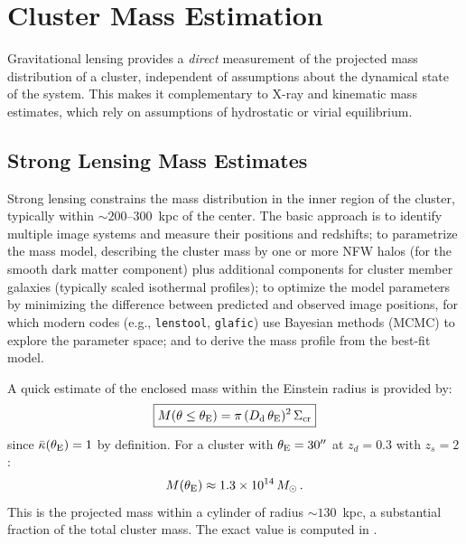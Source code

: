 \section{Cluster Mass Estimation}
\label{sec:mass_estimation}

Gravitational lensing provides a \textit{direct} measurement of the
projected mass distribution of a cluster, independent of assumptions
about the dynamical state of the system.  This makes it
complementary to X-ray and kinematic mass estimates, which rely on
assumptions of hydrostatic or virial equilibrium.

\subsection{Strong Lensing Mass Estimates}

Strong lensing constrains the mass distribution in the inner region
of the cluster, typically within $\sim 200$--$300$~kpc of the center.
The basic approach is to identify multiple image systems and measure
their positions and redshifts; to parametrize the mass model,
describing the cluster mass by one or more NFW halos (for the smooth
dark matter component) plus additional components for cluster member
galaxies (typically scaled isothermal profiles); to optimize the
model parameters by minimizing the difference between predicted and
observed image positions, for which modern codes (e.g.,
\texttt{lenstool}, \texttt{glafic}) use Bayesian methods (MCMC) to
explore the parameter space; and to derive the mass profile from the
best-fit model.

A quick estimate of the enclosed mass within the Einstein radius is
provided by:
\begin{equation}
    \boxed{
    M(\theta \leq \theta_{\mathrm{E}}) = \pi\, (D_{\mathrm{d}}\, \theta_{\mathrm{E}})^2\, \Sigma_{\mathrm{cr}}
    }
    \label{eq:mass_within_thetaE}
\end{equation}
since $\bar{\kappa}(\theta_{\mathrm{E}}) = 1$ by definition.  For a cluster with
$\theta_{\mathrm{E}} = 30''$ at $z_d = 0.3$ with $z_s = 2$:
\begin{equation}
    M(\theta_{\mathrm{E}}) \approx 1.3 \times 10^{14}\,M_{\odot} \,.
    \label{eq:mass_numerical}
\end{equation}
This is the projected mass within a cylinder of radius
$\sim 130$~kpc, a substantial fraction of the total cluster mass.
The exact value is computed in
.

